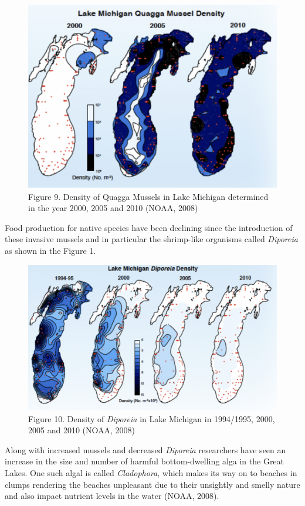 \documentclass[
]{book}
\begin{document}
\begin{figure}
\centering
\includegraphics{images/figure9.png}
\caption{Figure 9. Density of Quagga Mussels in Lake Michigan determined in the year 2000, 2005 and 2010 (NOAA, 2008)}
\end{figure}

Food production for native species have been declining since the introduction of these invasive mussels and in particular the shrimp-like organisms called \emph{Diporeia} as shown in the Figure 1.

\begin{figure}
\centering
\includegraphics{images/figure10.png}
\caption{Figure 10. Density of \emph{Diporeia} in Lake Michigan in 1994/1995, 2000, 2005 and 2010 (NOAA, 2008)}
\end{figure}

Along with increased mussels and decreased \emph{Diporeia} researchers have seen an increase in the size and number of harmful bottom-dwelling alga in the Great Lakes. One such algal is called \emph{Cladophora}, which makes its way on to beaches in clumps rendering the beaches unpleasant due to their unsightly and smelly nature and also impact nutrient levels in the water (NOAA, 2008).
\end{document}
